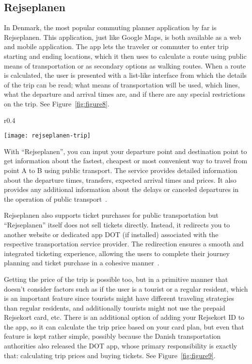 \subsection{Rejseplanen}\label{subsec:rejseplanen}

In Denmark, the most popular commuting planner application by far is Rejseplanen.
This application, just like Google Maps, is both available as a web and mobile application.
The app lets the traveler or commuter to enter trip starting and ending locations, which it then uses to calculate a
route using public means of transportation or as secondary options as walking routes.
When a route is calculated, the user is presented with a list-like interface from which the details of the trip can be
read; what means of transportation will be used, which lines, what the departure and arrival times are, and if there are
any special restrictions on the trip.
See Figure~\ref{fig:figure8}.

\begin{wrapfigure}{r}{0.4\textwidth}
    \begin{center}
        \texttt{[image: rejseplanen-trip]}
    \end{center}
    \caption{Rejseplanen mobile UI trip planner.}
    \label{fig:figure8}
\end{wrapfigure}

With ``Rejseplanen'', you can input your departure point and destination point to get information about the fastest,
cheapest or most convenient way to travel from point A to B using public transport.
The service provides detailed information about the departure times, transfers, expected arrival times and prices.
It also provides any additional information about the delays or canceled departures in the operation of public
transport~\cite{rejseplanen2023}.

Rejseplanen also supports ticket purchases for public transportation but ``Rejseplanen'' itself does not sell tickets
directly.
Instead, it redirects you to another website or dedicated app DOT (if installed) associated with the respective
transportation service provider.
The redirection ensures a smooth and integrated ticketing experience, allowing the users to complete their journey
planning and ticket purchase in a cohesive manner~\cite{rejseplanen2023}.

Getting the price of the trip is possible too, but in a primitive manner that doesn't consider factors such as if the
user is a tourist or a regular resident, which is an important feature since tourists might have different traveling
strategies than regular residents, and additionally tourists might not use the prepaid Rejsekort card, etc.
There is an additional option of adding your Rejsekort ID to the app, so it can calculate the trip price based on your
card plan, but even that feature is kept rather simple, possibly because the Danish transportation authorities also
released the DOT app, whose primary responsibility is exactly that: calculating trip prices and buying tickets.
See Figure~\ref{fig:figure9}.

